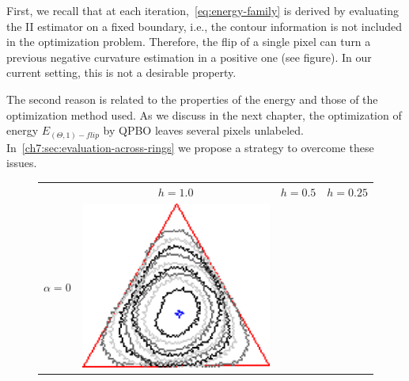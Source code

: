 First, we recall that at each iteration,~\cref{eq:energy-family} is derived by evaluating the II estimator on a fixed boundary, i.e., the contour information is not included in the optimization problem. Therefore, the flip of a single pixel can turn a previous negative curvature estimation in a positive one (see figure). In our current setting, this is not a desirable property. 

The second reason is related to the properties of the energy and those of the optimization method used. As we discuss in the next chapter, the optimization of energy $E_{(\Theta,1)-flip}$ by QPBO leaves several pixels unlabeled. In~\cref{ch7:sec:evaluation-across-rings} we propose a strategy to overcome these issues.



\begin{figure}
\center
\begin{tabular}{p{2.5em}ccc}
& $h=1.0$ & $h=0.5$ & $h=0.25$ \\[2em]
\multirow{2}{*}{$\alpha=0$}& \includegraphics[scale=0.25]{figures/chapter6/radius-effect/triangle/improve/len_pen0/radius-3/summary.pdf} &

\end{tabular}
\end{figure}
